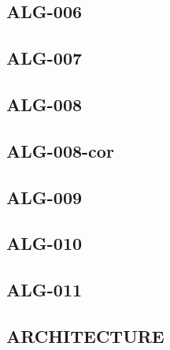 \begin{multicols}{2}
\renewcommand{\xxexo}{ALG-006}
\subsection*{\xxexo}
\graphicspath{{../../exos/algo/\xxexo/}}


\renewcommand{\xxexo}{ALG-007}
\subsection*{\xxexo}
\graphicspath{{../../exos/algo/\xxexo/}}


\renewcommand{\xxexo}{ALG-008}
\subsection*{\xxexo}
\graphicspath{{../../exos/algo/\xxexo/}}


\renewcommand{\xxexo}{ALG-008-cor}
\subsection*{\xxexo}
\graphicspath{{../../exos/algo/\xxexo/}}


\renewcommand{\xxexo}{ALG-009}
\subsection*{\xxexo}
\graphicspath{{../../exos/algo/\xxexo/}}


\renewcommand{\xxexo}{ALG-010}
\subsection*{\xxexo}
\graphicspath{{../../exos/algo/\xxexo/}}


\renewcommand{\xxexo}{ALG-011}
\subsection*{\xxexo}
\graphicspath{{../../exos/algo/\xxexo/}}


\end{multicols}

\begin{multicols}{2}

\section*{ARCHITECTURE}
%


\end{multicols}



